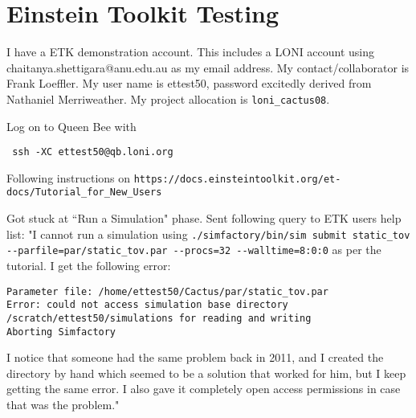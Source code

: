 \documentclass[12pt]{report}
\begin{document}
\chapter{Einstein Toolkit Testing}

I have a ETK demonstration account. This includes a LONI account using chaitanya.shettigara@anu.edu.au as my email address. My contact/collaborator is Frank Loeffler. My user name is ettest50, password excitedly derived from Nathaniel Merriweather. My project allocation is \verb+loni_cactus08+.

Log on to Queen Bee with
\begin{verbatim}
 ssh -XC ettest50@qb.loni.org
\end{verbatim}

Following instructions on \verb+https://docs.einsteintoolkit.org/et-docs/Tutorial_for_New_Users+

Got stuck at ``Run a Simulation" phase. Sent following query to ETK users help list:
"I cannot run a simulation using 
\verb+./simfactory/bin/sim submit static_tov --parfile=par/static_tov.par --procs=32 --walltime=8:0:0+
as per the tutorial. I get the following error:
\begin{verbatim}Parameter file: /home/ettest50/Cactus/par/static_tov.par
Error: could not access simulation base directory /scratch/ettest50/simulations for reading and writing
Aborting Simfactory\end{verbatim}

I notice that someone had the same problem back in 2011, and I created the directory by hand which seemed to be a solution that worked for him, but I keep getting the same error. I also gave it completely open access permissions in case that was the problem."
\end{document}
